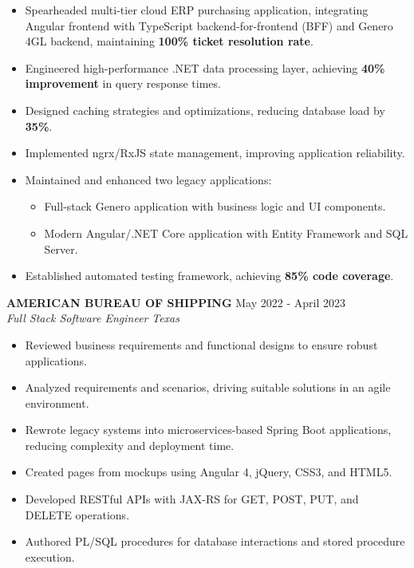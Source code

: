 \documentclass[11pt,letterpaper]{article}
\begin{document}
\vspace{0.2em}
\begin{itemize}
    \item Spearheaded multi-tier cloud ERP purchasing application, integrating Angular frontend with TypeScript backend-for-frontend (BFF) and Genero 4GL backend, maintaining \textbf{100\% ticket resolution rate}.
    \item Engineered high-performance .NET data processing layer, achieving \textbf{40\% improvement} in query response times.
    \item Designed caching strategies and optimizations, reducing database load by \textbf{35\%}.
    \item Implemented ngrx/RxJS state management, improving application reliability.
    \item Maintained and enhanced two legacy applications:
        \begin{itemize}
            \item Full-stack Genero application with business logic and UI components.
            \item Modern Angular/.NET Core application with Entity Framework and SQL Server.
        \end{itemize}
    \item Established automated testing framework, achieving \textbf{85\% code coverage}.
\end{itemize}

\vspace{0.4em}
\noindent\textbf{\large\color{sectioncolor} AMERICAN BUREAU OF SHIPPING} \hfill{\color{datecolor} May 2022 - April 2023}\\
\textit{Full Stack Software Engineer} \hfill \textit{Texas}

\vspace{0.2em}
\begin{itemize}
    \item Reviewed business requirements and functional designs to ensure robust applications.
    \item Analyzed requirements and scenarios, driving suitable solutions in an agile environment.
    \item Rewrote legacy systems into microservices-based Spring Boot applications, reducing complexity and deployment time.
    \item Created pages from mockups using Angular 4, jQuery, CSS3, and HTML5.
    \item Developed RESTful APIs with JAX-RS for GET, POST, PUT, and DELETE operations.
    \item Authored PL/SQL procedures for database interactions and stored procedure execution.
\end{itemize}
\end{document}
